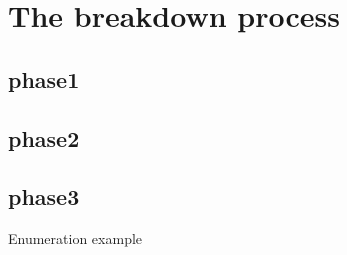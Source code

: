 \chapter[The breakdown process]{The breakdown process}

\section[phase1]{phase1}

\section[phase2]{phase2}

\section[phase3]{phase3}
Enumeration example
